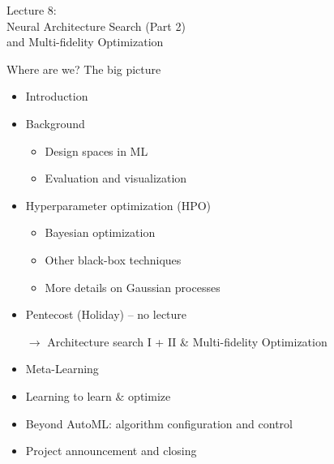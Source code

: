 \begin{frame}[c]{}

\centering
\huge
Lecture 8:\\
Neural Architecture Search (Part 2) \\
	and Multi-fidelity Optimization\\
\end{frame}
\begin{frame}[c]{Where are we? The big picture}

\begin{itemize}
	\item Introduction
	\item Background
	\begin{itemize}
		\item Design spaces in ML
		\item Evaluation and visualization
	\end{itemize}
	\item Hyperparameter optimization (HPO)
	\begin{itemize}
		\item Bayesian optimization
		\item Other black-box techniques
		\item More details on Gaussian processes
	\end{itemize}
	\item Pentecost (Holiday) -- no lecture
	\item[$\to$]  Architecture search I + II \& Multi-fidelity Optimization
	\item Meta-Learning
	\item Learning to learn $\&$ optimize
	\item Beyond AutoML: algorithm configuration and control
	\item Project announcement and closing
\end{itemize}

\end{frame}




